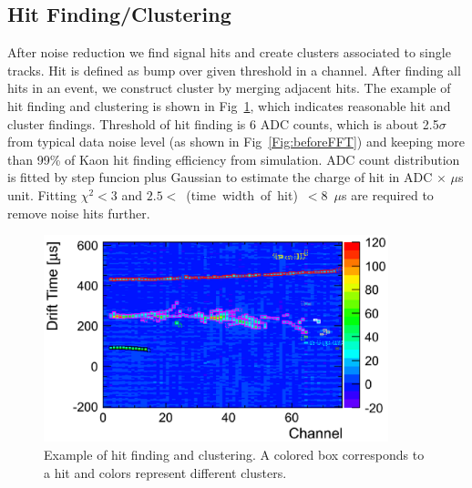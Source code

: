 \subsection{Hit Finding/Clustering}
After noise reduction we find signal hits and create clusters associated to single tracks. 
Hit is defined as bump over given threshold in a channel. 
After finding all hits in an event, we construct cluster by merging adjacent hits. 
The example of hit finding and clustering is shown in Fig~\ref{fig:Clustering}, which indicates reasonable hit and cluster findings. 
Threshold of hit finding is 6 ADC counts, which is about 2.5$\sigma$ from typical data noise level (as shown in Fig~\ref{Fig:beforeFFT}) and keeping more than 99\% of Kaon hit finding efficiency from simulation.
ADC count distribution is fitted by step funcion plus Gaussian to estimate the charge of hit in ADC $\times$ $\mu$s unit.
Fitting $\chi^2 < 3$ and $2.5<$~(time~width~of~hit)~$<8$~$\mu$s are required to remove noise hits further.

\begin{figure}[htbp]
 \begin{center}
  \includegraphics[width=100mm]{fig/clustering.eps}
 \end{center}
 \caption{Example of hit finding and clustering. A colored box corresponds to a hit and colors represent different clusters.}
 \label{fig:Clustering}
\end{figure}

